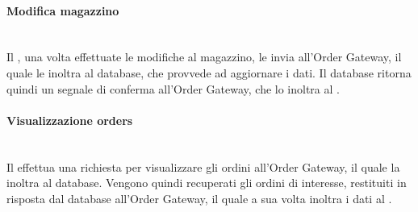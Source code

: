 \paragraph{Modifica magazzino}\mbox{}\\
Il \Manager{}, una volta effettuate le modifiche al magazzino, le invia all'Order Gateway, il quale le inoltra al database, che provvede ad aggiornare i dati. Il database ritorna quindi un segnale di conferma all'Order Gateway, che lo inoltra al \Manager{}.

\paragraph{Visualizzazione orders}\mbox{}\\
Il \Manager{} effettua una richiesta per visualizzare gli ordini all'Order Gateway, il quale la inoltra al database. Vengono quindi recuperati gli ordini di interesse, restituiti in risposta dal database all'Order Gateway, il quale a sua volta inoltra i dati al \Manager{}.

